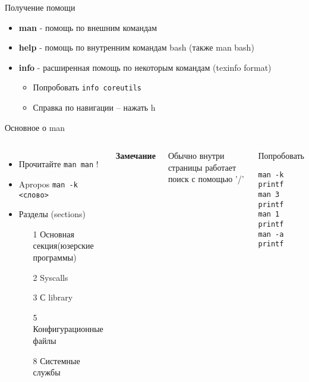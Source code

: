 \begin{frame}[fragile]{Получение помощи}
  \begin{itemize}
    \pause
    \item \textbf{man} - помощь по внешним командам
    \pause
    \item \textbf{help} - помощь по внутренним командам bash (также man bash)
    \pause
    \item \textbf{info} - расширенная помощь по некоторым командам (texinfo format)
      \begin{itemize}
       \item   Попробовать {\tt info coreutils}
       \item   Справка по навигации -- нажать h
      \end{itemize}
  \end{itemize}
\end{frame}

\begin{frame}[fragile]{Основное о man}
\begin{columns}
	\column{2.2in}
		\begin{itemize}
			\item Прочитайте {\tt man man} !
			\item Apropos {\tt man -k <слово>}
			\item Разделы (sections)
				\begin{itemize}
					\item[1] Основная секция(юзерские программы)
					\item[2] Syscalls
					\item[3] С library
					\item[5] Конфигурационные файлы
					\item[8] Системные службы
				\end{itemize}
		\end{itemize}
	  \textbf{Замечание}

	  Обычно внутри страницы работает поиск с помощью '/'
	\pause 
	
	\column{1in}
		\begin{block}{Попробовать}
			\begin{lstlisting}
man -k printf
man 3 printf
man 1 printf
man -a printf
			\end{lstlisting}
		\end{block}
	\end{columns}
\end{frame}


